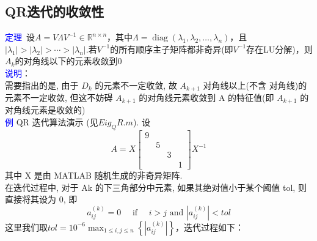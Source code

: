 \documentclass[12pt,a4paper]{article}
\begin{document}
\subsection{QR迭代的收敛性}
\textcolor{blue}{定理}~设$A=V \Lambda V^{-1} \in \mathbb{R}^{n \times n}$，其中$\Lambda=\operatorname{diag}\left(\lambda_{1}, \lambda_{2}, \ldots, \lambda_{n}\right)$，且$\left|\lambda_{1}\right|>\left|\lambda_{2}\right|>\cdots>\left|\lambda_{n}\right|$.若$V^{-1}$的所有顺序主子矩阵都非奇异(即$V^{-1}$存在LU分解)，则$A_{k}$的对角线以下的元素收敛到0\\
\textcolor{blue}{说明}：\\
需要指出的是, 由于 $D_{k}$ 的元素不一定收敛, 故 $A_{k+1}$ 对角线以上(不含 对角线)的元素不一定收敛, 但这不妨碍 $A_{k+1}$ 的对角线元素收敛到 A 的特征值(即 $A_{k+1}$ 的对角线元素是收敛的)\\
\textcolor{blue}{例} QR 迭代算法演示 (见$Eig_QR.m$). 设
$$
A=X\left[\begin{array}{cccc}
{9}&&& \\ 
&{5}&& \\
&&3& \\ 
 &&&{1}
 \end{array}\right] X^{-1}
$$
其中 X 是由 MATLAB 随机生成的非奇异矩阵.\\
在迭代过程中, 对于 Ak 的下三角部分中元素, 如果其绝对值小于某个阈值 tol, 则直接将其设为 0, 即
$$
a_{i j}^{(k)}=0 \quad \text { if } \quad i>j \text { and }\left|a_{i j}^{(k)}\right|<t o l
$$
这里我们取$t o l=10^{-6} \max _{1 \leq i, j \leq n}\left\{\left|a_{i j}^{(k)}\right|\right\}$，迭代过程如下：
\end{document}
